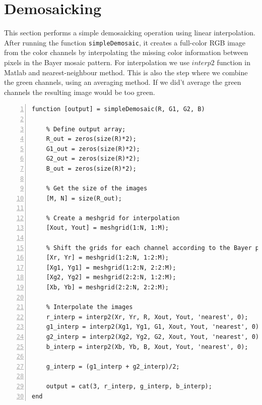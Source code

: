 \documentclass[12pt,a4paper,english
]{tunithesis}
\begin{document}
\section{Demosaicking}
This section performs a simple demosaicking operation using linear interpolation. After running the function \texttt{simpleDemosaic}, it creates a full-color RGB image from the color channels by interpolating the missing color information between pixels in the Bayer mosaic pattern. For interpolation we use $interp2$ function in Matlab and nearest-neighbour method. This is also the step where we combine the green channels, using an averaging method. If we did't average the green channels the resulting image would be too green.

\begin{lstlisting}[style=Matlab-editor, numbers=left, basicstyle=\footnotesize]
function [output] = simpleDemosaic(R, G1, G2, B)

    % Define output array;
    R_out = zeros(size(R)*2);
    G1_out = zeros(size(R)*2);
    G2_out = zeros(size(R)*2);
    B_out = zeros(size(R)*2);

    % Get the size of the images
    [M, N] = size(R_out);

    % Create a meshgrid for interpolation
    [Xout, Yout] = meshgrid(1:N, 1:M);

    % Shift the grids for each channel according to the Bayer pattern
    [Xr, Yr] = meshgrid(1:2:N, 1:2:M);
    [Xg1, Yg1] = meshgrid(1:2:N, 2:2:M);
    [Xg2, Yg2] = meshgrid(2:2:N, 1:2:M);
    [Xb, Yb] = meshgrid(2:2:N, 2:2:M);

    % Interpolate the images
    r_interp = interp2(Xr, Yr, R, Xout, Yout, 'nearest', 0);
    g1_interp = interp2(Xg1, Yg1, G1, Xout, Yout, 'nearest', 0);
    g2_interp = interp2(Xg2, Yg2, G2, Xout, Yout, 'nearest', 0);
    b_interp = interp2(Xb, Yb, B, Xout, Yout, 'nearest', 0);

    g_interp = (g1_interp + g2_interp)/2;

    output = cat(3, r_interp, g_interp, b_interp);
end
\end{lstlisting}
\end{document}
